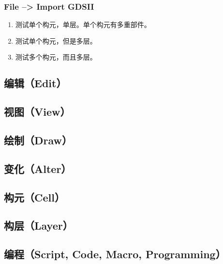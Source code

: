 \subsubsection{File --> Import GDSII }
\begin{enumerate}
	\item 测试单个构元，单层。单个构元有多重部件。
	\item 测试单个构元，但是多层。
	\item 测试多个构元，而且多层。
\end{enumerate}

\subsection{编辑（Edit）} \label{SectMaskMenuEdit} 
\subsection{视图（View）} \label{SectMaskMenuView} 
\subsection{绘制（Draw）} \label{SectMaskMenuDraw} 


\subsection{变化（Alter）} \label{SectMaskMenuAlter} 
\subsection{构元（Cell）} \label{SectMaskMenuCell}
\subsection{构层（Layer）} \label{SectMaskMenuLayer}
\subsection{编程（Script, Code, Macro, Programming）} \label{SectMaskMenuCode} 
